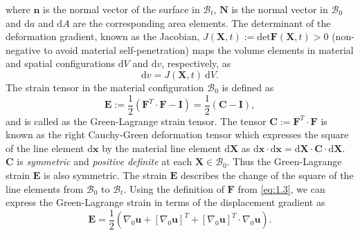 \documentclass[11pt,a4paper,final]{article}
\begin{document}
where $\mathbf{n}$ is the normal vector of the surface in $\mathcal{B}_t$, $\mathbf{N}$ is the normal vector in $\mathcal{B}_0$ and $\mathrm{d}a$ and $\mathrm{d}A$ are the corresponding area elements. The determinant of the deformation gradient, known as the Jacobian, $J(\mathbf{X}, t) := \text{det} \mathbf{F}(\mathbf{X}, t) > 0$ (non-negative to avoid material self-penetration) maps the volume elements in material and spatial configurations $\mathrm{d}V$ and $\mathrm{d}v$, respectively, as 
\begin{equation}
\mathrm{d}v = J(\mathbf{X}, t) \ \mathrm{d}V.
\end{equation} 
The strain tensor in the material configuration $\mathcal{B}_0$ is defined as
\begin{equation}
\mathbf{E} := \frac{1}{2} (\mathbf{F}^T \cdot \mathbf{F} - \mathbf{I}) = \frac{1}{2} (\mathbf{C} - \mathbf{I}),
\end{equation}
and is called as the Green-Lagrange strain tensor. The tensor $\mathbf{C}:= \mathbf{F}^T \cdot \mathbf{F}$ is known as the right Cauchy-Green deformation tensor which expresses the square of the line element $\bm{\mathrm{d}}\mathbf{x}$ by the material line element $\bm{\mathrm{d}}\mathbf{X}$ as $\bm{\mathrm{d}}\mathbf{x} \cdot \bm{\mathrm{d}}\mathbf{x} = \bm{\mathrm{d}}\mathbf{X} \cdot \mathbf{C} \cdot \bm{\mathrm{d}}\mathbf{X}$. $\mathbf{C}$ is \textit{symmetric} and \textit{positive definite} at each $\mathbf{X} \in \mathcal{B}_0$. Thus the Green-Lagrange strain $\mathbf{E}$ is also symmetric. The strain $\mathbf{E}$ describes the change of the square of the line elements from $\mathcal{B}_0$ to $\mathcal{B}_t$. Using the definition of $\mathbf{F}$ from \eqref{eq:1.3}, we can express the Green-Lagrange strain in terms of the displacement gradient as 
\begin{equation}
\mathbf{E} = \frac{1}{2} ( \nabla_0 \mathbf{u} + [\nabla_0 \mathbf{u}]^T + [\nabla_0 \mathbf{u}]^T \cdot \nabla_0 \mathbf{u} ).
\end{equation}
\end{document}
